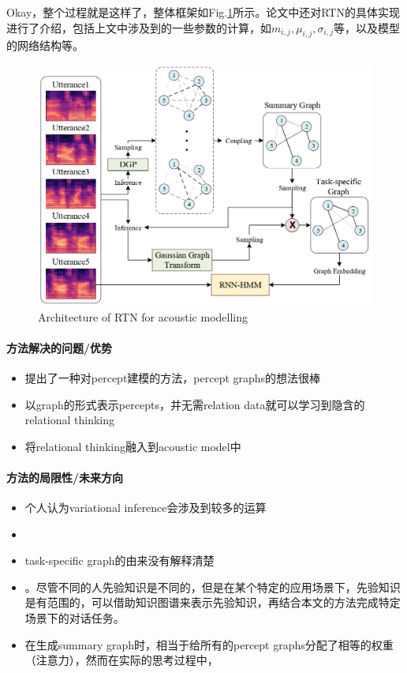 Okay，整个过程就是这样了，整体框架如Fig.\ref{fig:dgp}所示。论文中还对RTN的具体实现进行了介绍，包括上文中涉及到的一些参数的计算，如$m_{i,j}, \mu_{i, j}, \sigma_{i, j}$等，以及模型的网络结构等。
\begin{figure}[h]
	\centering
	\includegraphics[width=.8\textwidth]{pics/dgp.PNG}
	\caption{Architecture of RTN for acoustic modelling}
	\label{fig:dgp}
\end{figure}

\paragraph{方法解决的问题/优势}

\begin{itemize}
	\item 提出了一种对percept建模的方法，percept graphs的想法很棒
	\item 以graph的形式表示percepts，并无需relation data就可以学习到隐含的relational thinking
	\item 将relational thinking融入到acoustic model中
\end{itemize}



\paragraph{方法的局限性/未来方向}
\begin{itemize}
	\item 个人认为variational inference会涉及到较多的运算
	\item {}
	\item task-specific graph的由来没有解释清楚	
	\item {}。尽管不同的人先验知识是不同的，但是在某个特定的应用场景下，先验知识是有范围的，可以借助知识图谱来表示先验知识，再结合本文的方法完成特定场景下的对话任务。
	\item 在生成summary graph时，相当于给所有的percept graphs分配了相等的权重（注意力），然而在实际的思考过程中，

\end{itemize}
